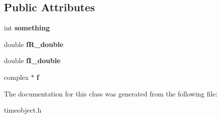 \subsection*{Public Attributes}
\begin{DoxyCompactItemize}
\item 
\mbox{\label{classtimeobject_a9613bee581af54851a654c09016361ae}} 
int {\bfseries something}
\item 
\mbox{\label{classtimeobject_a030b6682e6e68eba1f2edc1a1ed5bd49}} 
double {\bfseries f\+R\+\_\+double}
\item 
\mbox{\label{classtimeobject_a630ba9c65c5ca2d3733260b6164ceac7}} 
double {\bfseries f\+I\+\_\+double}
\item 
\mbox{\label{classtimeobject_a596e85bc8a12fe0f9be0b0e5823385e1}} 
complex $\ast$ {\bfseries f}
\end{DoxyCompactItemize}


The documentation for this class was generated from the following file\+:\begin{DoxyCompactItemize}
\item 
timeobject.\+h\end{DoxyCompactItemize}
